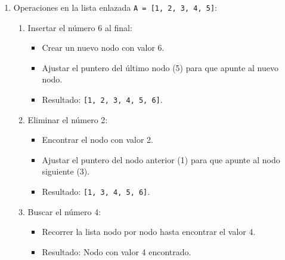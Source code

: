 \documentclass[12pt]{article}
\begin{document}
\begin{enumerate}
            \item Operaciones en la lista enlazada \texttt{A = [1, 2, 3, 4, 5]}:
            \begin{enumerate}
                \item Insertar el número 6 al final:
                \begin{itemize}
                    \item Crear un nuevo nodo con valor 6.
                    \item Ajustar el puntero del último nodo (5) para que apunte al nuevo nodo.
                    \item Resultado: \texttt{[1, 2, 3, 4, 5, 6]}.
                \end{itemize}
                \item Eliminar el número 2:
                \begin{itemize}
                    \item Encontrar el nodo con valor 2.
                    \item Ajustar el puntero del nodo anterior (1) para que apunte al nodo siguiente (3).
                    \item Resultado: \texttt{[1, 3, 4, 5, 6]}.
                \end{itemize}
                \item Buscar el número 4:
                \begin{itemize}
                    \item Recorrer la lista nodo por nodo hasta encontrar el valor 4.
                    \item Resultado: Nodo con valor 4 encontrado.
                \end{itemize}
            \end{enumerate}


\end{enumerate}
\end{document}
